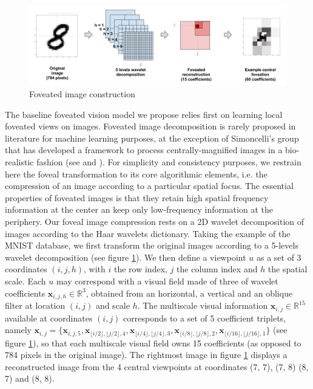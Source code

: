 \documentclass{article} %
\begin{document}
\begin{figure}[t!]
	\centerline{
		\includegraphics[width = \linewidth]{img/ICLR-foveated-model.png} 
	}
	\caption{Foveated image construction}\label{fig:foveated}
\end{figure}

The baseline foveated vision model we propose relies first on learning local foveated views on images. Foveated image decomposition is rarely proposed in literature for machine learning purposes, at the exception of Simoncelli's group that has developed a framework to process centrally-magnified images in a bio-realistic fashion (see \cite{freeman2011metamers} and \cite{Deza2016piranhas}). For simplicity and consistency purposes, we restrain here the foveal transformation to its core algorithmic elements, i.e. the compression of an image according to a particular spatial focus. The essential properties of foveated images is that they retain high spatial frequency information at the center an keep only low-frequency information at the periphery. Our foveal image compression rests on a 2D wavelet decomposition of images according to the Haar wavelets dictionary. Taking the example of the MNIST database, we first transform the original images according to a 5-levels wavelet decomposition (see figure \ref{fig:foveated}). We then define a viewpoint $u$ as a set of 3 coordinates $(i,j,h)$, with $i$ the row index, $j$ the column index and $h$ the spatial scale. Each $u$ may correspond with a visual field made of three of wavelet coefficients $\boldsymbol{x}_{i,j,h} \in \mathbb{R}^3$, obtained from an horizontal, a vertical and an oblique filter at location $(i,j)$ and scale $h$.  The multiscale visual information $\boldsymbol{x}_{i,j} \in \mathbb{R}^{15}$ available at coordinates $(i,j)$ corresponds to a set of 5 coefficient triplets, namely $\boldsymbol{x}_{i,j}=\{\boldsymbol{x}_{i,j,5}, \boldsymbol{x}_{\lfloor i/2\rfloor,\lfloor j/2\rfloor,4}, \boldsymbol{x}_{\lfloor i/4\rfloor,\lfloor j/4\rfloor,3}, \boldsymbol{x}_{\lfloor i/8\rfloor,\lfloor j/8\rfloor, 2}, \boldsymbol{x}_{\lfloor i/16\rfloor,\lfloor j/16\rfloor, 1}\}$ (see figure \ref{fig:foveated}), so that each multiscale visual field owns 15 coefficients (as opposed to 784 pixels in the original image).
The rightmost image in figure \ref{fig:foveated} displays a reconstructed image from the 4 central viewpoints at coordinates (7, 7), (7, 8) (8, 7) and (8, 8).
\end{document}

